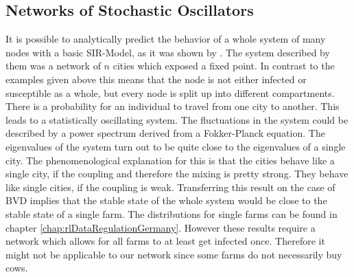 \subsection{Networks of Stochastic Oscillators}
It is possible to analytically predict the behavior of a whole system of many nodes with a basic SIR-Model, as it was shown by \citep{ROZ11}. The system described by them was a network of $n$ cities which exposed a fixed point. In contrast to the examples given above this means that the node is not either infected or susceptible as a whole, but every node is split up into different compartments. There is a probability for an individual to travel from one city to another. This leads to a statistically oscillating system. The fluctuations in the system could be described by a power spectrum derived from a Fokker-Planck equation. 
The eigenvalues of the system turn out to be quite close to the eigenvalues of a single city. The phenomenological explanation for this is that the cities behave like a single city, if the coupling and therefore the mixing is pretty strong. They behave like single cities, if the coupling is weak. 
Transferring this result on the case of BVD implies that the stable state of the whole system would be close to the stable state of a single farm. The distributions for single farms can be found in chapter \ref{chap:rlDataRegulationGermany}. However these results require a network which allows for all farms to at least get infected once. Therefore it might not be applicable to our network since some farms do not necessarily buy cows.